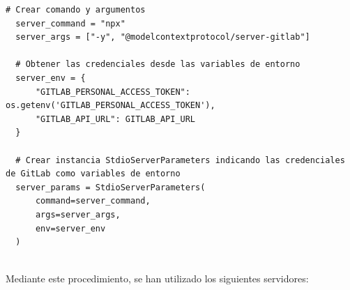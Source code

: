 \begin{lstlisting}[caption={\protect\opus{mcp_multi_client.py}: instanciado de StdioServerParameters para el servidor MCP de GitLab},label={lst:mcpgitlab}]
  # Crear comando y argumentos
  server_command = "npx"
  server_args = ["-y", "@modelcontextprotocol/server-gitlab"]

  # Obtener las credenciales desde las variables de entorno
  server_env = {
      "GITLAB_PERSONAL_ACCESS_TOKEN": os.getenv('GITLAB_PERSONAL_ACCESS_TOKEN'),
      "GITLAB_API_URL": GITLAB_API_URL
  }

  # Crear instancia StdioServerParameters indicando las credenciales de GitLab como variables de entorno
  server_params = StdioServerParameters(
      command=server_command,
      args=server_args,
      env=server_env
  )
  
\end{lstlisting}
Mediante este procedimiento, se han utilizado los siguientes servidores:
